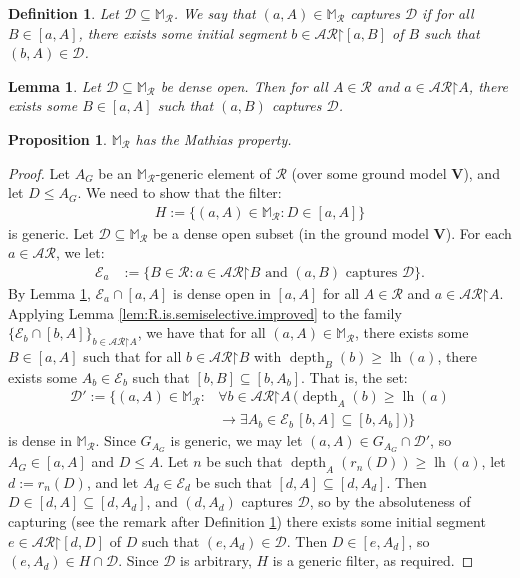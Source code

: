 \documentclass[10pt,a4paper]{amsart}
\newtheorem{lemma}{Lemma}
\newtheorem{definition}{Definition}
\newtheorem{proposition}{Proposition}
\newcommand{\D}{\cal{D}}
\newcommand{\E}{\cal{E}}
\newcommand{\V}{\bf{V}}
\renewcommand{\bf}{\mathbf}
\newcommand{\cal}{\mathcal}
\newcommand{\depth}{\func{depth}}
\newcommand{\func}{\operatorname}
\newcommand{\lh}{\func{lh}}
\newcommand{\restrictedto}{\mathord{\upharpoonright}}
\begin{document}
\begin{definition}
\label{def:capture}
    Let $\D \subseteq \mathbb{M}_\cal{R}$. We say that $(a,A) \in \mathbb{M}_\cal{R}$ \emph{captures} $\D$ if for all $B \in [a,A]$, there exists some initial segment $b \in \cal{AR}\restrictedto[a,B]$ of $B$ such that $(b,A) \in \D$.
\end{definition}

\begin{lemma}
\label{lem:capturing.possible}
    Let $\D \subseteq \mathbb{M}_\cal{R}$ be dense open. Then for all $A \in \cal{R}$ and $a \in \cal{AR}\restrictedto A$, there exists some $B \in [a,A]$ such that $(a,B)$ captures $\D$.
\end{lemma}

\begin{proposition}
\label{prop:semiselective.implies.Mathias}
    $\mathbb{M}_\cal{R}$ has the Mathias property.
\end{proposition}

\begin{proof}
    Let $A_G$ be an $\mathbb{M}_\cal{R}$-generic element of $\cal{R}$ (over some ground model $\V$), and let $D \leq A_G$. We need to show that the filter:
    \begin{align*}
        H := \{(a,A) \in \mathbb{M}_\cal{R} : D \in [a,A]\}
    \end{align*}
    is generic. Let $\D \subseteq \mathbb{M}_\cal{R}$ be a dense open subset (in the ground model $\V$). For each $a \in \cal{AR}$, we let:
    \begin{align*}
        \E_a &:= \{B \in \cal{R} : a \in \cal{AR}\restrictedto B \text{ and $(a,B)$ captures $\D$}\}.
    \end{align*}
    By Lemma \ref{lem:capturing.possible}, $\E_a \cap [a,A]$ is dense open in $[a,A]$ for all $A \in \cal{R}$ and $a \in \cal{AR}\restrictedto A$. Applying Lemma \ref{lem:R.is.semiselective.improved} to the family $\{\E_b \cap [b,A]\}_{b \in \cal{AR}\restrictedto A}$, we have that for all $(a,A) \in \mathbb{M}_\cal{R}$, there exists some $B \in [a,A]$ such that for all $b \in \cal{AR}\restrictedto B$ with $\depth_B(b) \geq \lh(a)$, there exists some $A_b \in \E_b$ such that $[b,B] \subseteq [b,A_b]$. That is, the set:
    \begin{align*}
        \D' := \{(a,A) \in \mathbb{M}_\cal{R} : {}&\forall b \in \cal{AR}\restrictedto A \, (\depth_A(b) \geq \lh(a) \\
        &\to \exists A_b \in \E_b \, [b,A] \subseteq [b,A_b])\}
    \end{align*}
    is dense in $\mathbb{M}_\cal{R}$. Since $G_{A_G}$ is generic, we may let $(a,A) \in G_{A_G} \cap \D'$, so $A_G \in [a,A]$ and $D \leq A$. Let $n$ be such that $\depth_A(r_n(D)) \geq \lh(a)$, let $d := r_n(D)$, and let $A_d \in \E_d$ be such that $[d,A] \subseteq [d,A_d]$. Then $D \in [d,A] \subseteq [d,A_d]$, and $(d,A_d)$ captures $\D$, so by the absoluteness of capturing (see the remark after Definition \ref{def:capture}) there exists some initial segment $e \in \cal{AR}\restrictedto[d,D]$ of $D$ such that $(e,A_d) \in \D$. Then $D \in [e,A_d]$, so $(e,A_d) \in H \cap \D$. Since $\D$ is arbitrary, $H$ is a generic filter, as required.
\end{proof}
\end{document}
